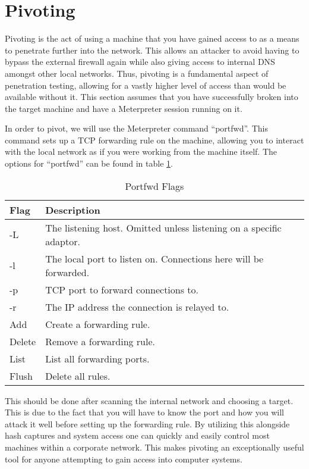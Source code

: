 	\section{Pivoting}
		Pivoting is the act of using a machine that you have gained access to as a means to penetrate further into the network.
		This allows an attacker to avoid having to bypass the external firewall again while also giving access to internal DNS amongst other local networks.
		Thus, pivoting is a fundamental aspect of penetration testing, allowing for a vastly higher level of access than would be available without it.
		This section assumes that you have successfully broken into the target machine and have a Meterpreter session running on it.

		In order to pivot, we will use the Meterpreter command ``portfwd''.
		This command sets up a TCP forwarding rule on the machine, allowing you to interact with the local network as if you were working from the machine itself.
		The options for ``portfwd'' can be found in table \ref{tab:portfwdFlags}.
		\begin{table}[htb]
			\centering
				\begin{adjustbox}{max width=1\textwidth}
			\begin{tabular}{l l }
				\toprule
				\textbf{Flag} & \textbf{Description} \\
				\toprule
				-L & The listening host. Omitted unless listening on a specific adaptor.\\
				-l & The local port to listen on. Connections here will be forwarded. \\
				-p & TCP port to forward connections to. \\
				-r & The IP address the connection is relayed to. \\
				Add & Create a forwarding rule. \\
				Delete & Remove a forwarding rule. \\
				List & List all forwarding ports. \\
				Flush & Delete all rules. \\
				\bottomrule
			\end{tabular}
		\end{adjustbox}
			\caption{Portfwd Flags}
			\label{tab:portfwdFlags}
		\end{table}
		This should be done after scanning the internal network and choosing a target.
		This is due to the fact that you will have to know the port and how you will attack it well before setting up the forwarding rule.
		By utilizing this alongside hash captures and system access one can quickly and easily control most machines within a corporate network.
		This makes pivoting an exceptionally useful tool for anyone attempting to gain access into computer systems.

